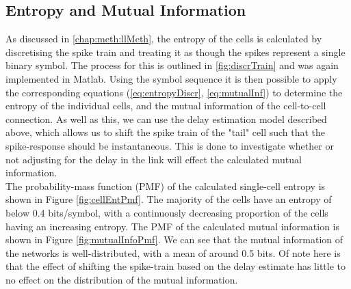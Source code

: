 \subsection{Entropy and Mutual Information}
As discussed in \ref{chap:meth:llMeth}, the entropy of the cells is calculated by discretising the spike train and treating it as though the spikes represent a single binary symbol. The process for this is outlined in \ref{fig:discrTrain} and was again implemented in Matlab. Using the symbol sequence it is then possible to apply the corresponding equations (\ref{eq:entropyDiscr}, \ref{eq:mutualInf}) to determine the entropy of the individual cells, and the mutual information of the cell-to-cell connection. As well as this, we can use the delay estimation model described above, which allows us to shift the spike train of the "tail" cell such that the spike-response should be instantaneous. This is done to investigate whether or not adjusting for the delay in the link will effect the calculated mutual information.\\
The probability-mass function (PMF) of the calculated single-cell entropy is shown in Figure \ref{fig:cellEntPmf}. The majority of the cells have an entropy of below 0.4 bits/symbol, with a continuously decreasing proportion of the cells having an increasing entropy. The PMF of the calculated mutual information is shown in Figure \ref{fig:mutualInfoPmf}. We can see that the mutual information of the networks is well-distributed, with a mean of around 0.5 bits. Of note here is that the effect of shifting the spike-train based on the delay estimate has little to no effect on the distribution of the mutual information. \\

